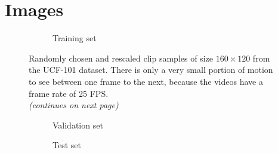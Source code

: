 
 \label{chapter:appendix}

\section{Images}

\begin{figure}[h!tb]
\centering
\begin{subfigure}{1.0\textwidth}
  \centering
  \caption{Training set}
  \label{fig:ucf_train_full}
  \vspace{.1cm}
\end{subfigure}
\caption[UCF-101 Full Image Samples]{Randomly chosen and rescaled clip samples of size $160 \times 120$ from the UCF-101 dataset. There is only a very small portion of motion to see between one frame to the next, because the videos have a frame rate of \num{25} FPS.\\
\textit{(continues on next page)}}
\label{fig:ucf_full}
\end{figure}



\begin{figure}[h!tb]
\ContinuedFloat %
\centering
\begin{subfigure}{1.0\textwidth}
  \centering
  \caption{Validation set}
  \label{fig:ucf_valid_full}
  \vspace{.1cm}
\end{subfigure}
\begin{subfigure}{1.0\textwidth}
  \centering
  \caption{Test set}
  \label{fig:ucf_test_full}
\end{subfigure}
\caption*{}
\end{figure}







